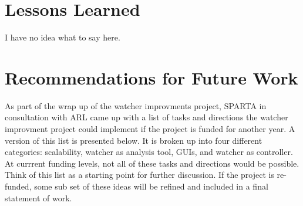 \documentclass{report}
\begin{document}
\section{Lessons Learned}
I have no idea what to say here. 

\section{Recommendations for Future Work}
As part of the wrap up of the watcher improvments project, SPARTA in consultation with ARL came up with a list of tasks and directions
the watcher improvment project could implement if the project is funded for another year. A version of this list is presented below. It is 
broken up into four different categories: scalability, watcher as analysis tool, GUIs, and watcher as controller. 
At currrent funding levels, not all of these tasks and directions would be possible. Think of this list as a starting point for further
discussion. If the project is re-funded, some sub set of these ideas will be refined and included in a final statement of work. 
\end{document}
